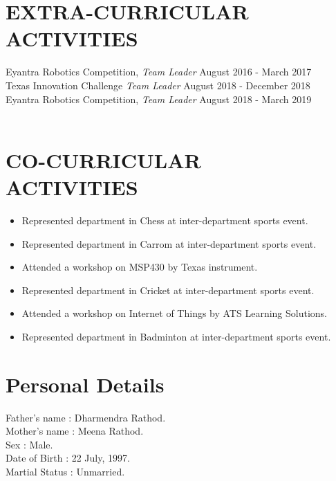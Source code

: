 \documentclass[margin, 11pt]{res} %
\begin{document}
\begin{resume}
\vspace{.15in}
\section{EXTRA-CURRICULAR \\ ACTIVITIES} 

Eyantra Robotics Competition, {\sl Team Leader} \hfill August 2016 - March 2017\\
Texas Innovation Challenge {\sl Team Leader} \hfill August 2018 - December 2018\\
Eyantra Robotics Competition, {\sl Team Leader} \hfill August 2018 - March 2019\\
 \\


\vspace{.15in}
\section{CO-CURRICULAR \\ ACTIVITIES} 

\begin{itemize}
	\item Represented department in Chess at inter-department sports event.
	\item Represented department in Carrom at inter-department sports event.
	\item Attended a workshop on MSP430 by Texas instrument.
	\item Represented department in Cricket at inter-department sports event.
	\item Attended a workshop on Internet of Things by ATS Learning Solutions. 
	\item Represented department in Badminton at inter-department sports event.\\
\end{itemize}


\vspace{.15in}
\section{Personal Details}

Father's name : Dharmendra Rathod. \\
Mother's name : Meena Rathod. \\
Sex : Male.\\
Date of Birth : 22 July, 1997.\\
Martial Status : Unmarried.


\end{resume}
\end{document}
